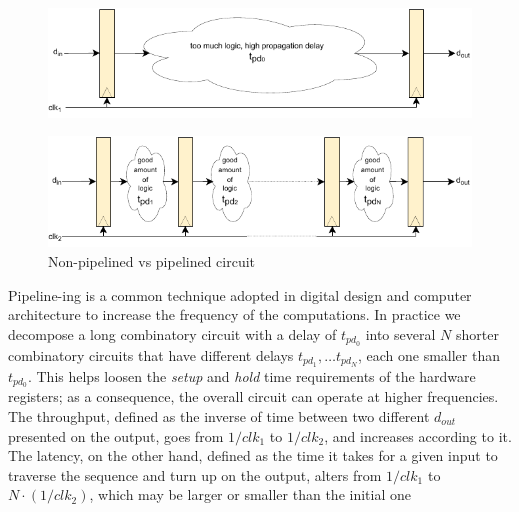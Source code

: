 \begin{figure}
    \centering
    \includegraphics[width=1\textwidth]{figures/pipeline_drawio1.pdf}
\end{figure}
\begin{figure}
    \includegraphics[width=1\textwidth]{figures/pipeline_drawio2.pdf}
    \caption{Non-pipelined vs pipelined circuit} 
    \label{fig:pipeline_vs_nonpipeline}
\end{figure}

Pipeline-ing is a common technique adopted in digital design and computer architecture to increase the frequency of the computations. In practice we decompose a long combinatory circuit with a delay of $t_{pd_0}$ into several $N$ shorter combinatory circuits that have different delays $t_{pd_1}, \dots t_{pd_{N}}$, each one smaller than $t_{pd_0}$. This helps loosen the \textit{setup} and \textit{hold} time requirements of the hardware registers;  as a consequence, the overall circuit can operate at higher frequencies. The throughput, defined as the inverse of time between two different $d_{out}$ presented on the output, goes from $1/clk_1$ to $1/clk_2$, and increases according to it.
The latency, on the other hand, defined as the time it takes for a given input to traverse the sequence and turn up on the output, alters from $1/clk_1$ to $N \cdot (1/clk_2)$, which may be larger or smaller than the initial one

